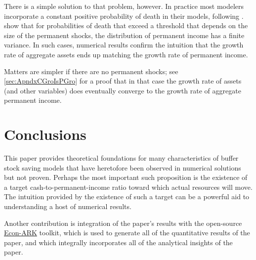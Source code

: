\documentclass[BufferStockTheory]{subfiles}
\begin{document}
{  There is a simple solution to that problem, however. In practice most modelers incorporate a constant positive probability of death in their models, following \cite{blanchardFinite}.  \cite{cstwMPC} show that for probabilities of death that exceed a threshold that depends on the size of the permanent shocks, the distribution of permanent income has a finite variance.  In such cases, numerical results confirm the intuition that the growth rate of aggregate assets ends up matching the growth rate of permanent income.

  Matters are simpler if there are no permanent shocks; see \ref{sec:ApndxCGroIsPGro} for a proof that in that case the growth rate of assets (and other variables) does eventually converge to the growth rate of aggregate permanent income.

} %

\hypertarget{Conclusions}{}
\section{Conclusions}

This paper provides theoretical foundations for many characteristics
of buffer stock saving models that have heretofore been observed in
numerical solutions but not proven.  Perhaps the most important such
proposition is the existence of a target cash-to-permanent-income
ratio toward which actual resources will move.  The intuition provided by
the existence of such a target can be a powerful aid to understanding a host
of numerical results.

Another contribution is integration of the paper's results with the open-source \href{https://econ-ark.org}{Econ-ARK} toolkit, which is used to generate all of the quantitative results of the paper, and which integrally incorporates all of the analytical insights of the paper.

\begin{equation*}
  \label{eq:Dummy}
\end{equation*}


\clearpage\vfill\eject

\onlyinsubfile{}

\end{document}
